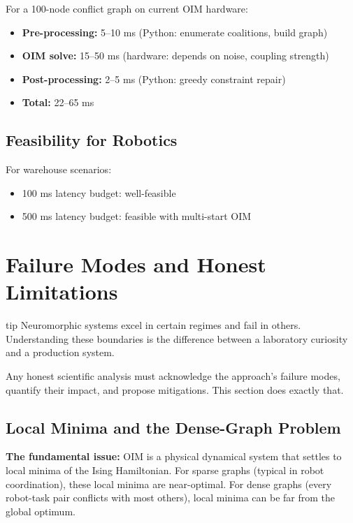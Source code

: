 For a 100-node conflict graph on current OIM hardware:

\begin{itemize}
\item \textbf{Pre-processing:} 5--10 ms (Python: enumerate coalitions, build graph)
\item \textbf{OIM solve:} 15--50 ms (hardware: depends on noise, coupling strength)
\item \textbf{Post-processing:} 2--5 ms (Python: greedy constraint repair)
\item \textbf{Total:} 22--65 ms
\end{itemize}

\subsection{Feasibility for Robotics}

For warehouse scenarios:
\begin{itemize}
\item 100 ms latency budget: well-feasible
\item 500 ms latency budget: feasible with multi-start OIM
\end{itemize}

\section{Failure Modes and Honest Limitations}
\label{sec:oim-limitations}

\begin{block}{tip}
Neuromorphic systems excel in certain regimes and fail in others. Understanding these boundaries is the difference between a laboratory curiosity and a production system.
\end{block}

Any honest scientific analysis must acknowledge the approach's failure modes, quantify their impact, and propose mitigations. This section does exactly that.

\subsection{Local Minima and the Dense-Graph Problem}

\textbf{The fundamental issue:} OIM is a physical dynamical system that settles to local minima of the Ising Hamiltonian. For sparse graphs (typical in robot coordination), these local minima are near-optimal. For dense graphs (every robot-task pair conflicts with most others), local minima can be far from the global optimum.

